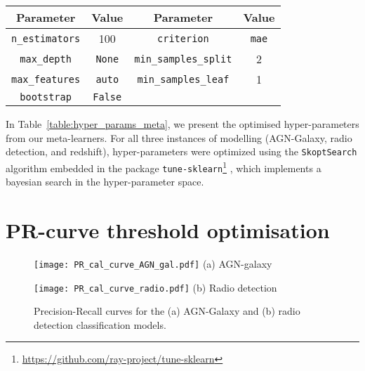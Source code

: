 \documentclass{aa}
\begin{document}
\begin{appendix}
\begin{table}
{\begin{tabular}{c c c c}
Parameter                           & Value             & Parameter                     & Value         \\
\hline
\texttt{n\_estimators}              & 100               & \texttt{criterion}            & \texttt{mae}  \\
\texttt{max\_depth}                 & \texttt{None}     & \texttt{min\_samples\_split}  & 2             \\
\texttt{max\_features}              & \texttt{auto}     & \texttt{min\_samples\_leaf}   & 1             \\
\texttt{bootstrap}                  & \texttt{False}    &                               &               \\
\hline
\end{tabular}
}
\end{table}

In Table~\ref{table:hyper_params_meta}, we present the optimised hyper-parameters from our meta-learners. For all three instances of modelling (AGN-Galaxy, radio detection, and redshift), hyper-parameters were optimized using the \verb|SkoptSearch| algorithm embedded in the package \verb|tune-sklearn|\footnote{\url{https://github.com/ray-project/tune-sklearn}} \citep[\texttt{v0.4.1};][]{head_tim_2021_5565057}, which implements a bayesian search in the hyper-parameter space.

\section{PR-curve threshold optimisation}\label{sec:app_pr_curve}

\begin{figure}
  \centering
  \begin{minipage}{0.24\textwidth}
    \centering
    \texttt{[image: PR\_cal\_curve\_AGN\_gal.pdf]}\hfill\break
    {(a) AGN-galaxy} 
  \end{minipage}
  \hfill 
  \begin{minipage}{0.24\textwidth}
    \centering
    \texttt{[image: PR\_cal\_curve\_radio.pdf]}\hfill\break
    {(b) Radio detection}
  \end{minipage}
  \centering
  \caption{Precision-Recall curves for the (a) AGN-Galaxy and (b) radio detection classification models.}
  \label{fig:PR_curves_classification}
\end{figure}


\end{appendix}
\end{document}
